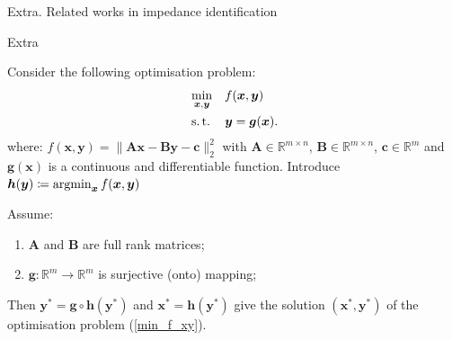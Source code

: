 \documentclass[../main.tex]{subfiles}
\begin{document}
\begin{frame}[t, noframenumbering]{Extra. Related works in impedance identification}
\begin{itemize}
\begin{itemize}
{\begin{figure}[H]
\end{figure}
}
\end{itemize}
\end{itemize}
\end{frame}

\begin{frame}[t]{Extra}

Consider the following optimisation problem:
\begin{equation}
\begin{aligned}
& \min_{\bm{x}, \bm{y}} 
& & f(\bm{x}, \bm{y}) \\
& \operatorname{s.t.}
& & \bm{y} = \bm{g}(\bm{x}).
\end{aligned}
\label{min_f_xy}
\end{equation}
where:
$f(\bm{x}, \bm{y}) = \|\bm{A}\bm{x} - \bm{B}\bm{y} - \bm{c} \|_2^2$ with $\bm{A} \in \mathbb{R}^{m\times n}$, $\bm{B} \in \mathbb{R}^{m\times n}$, $\bm{c} \in \mathbb{R}^{m}$ and $\bm{g}(\bm{x})$ is a continuous and differentiable function. Introduce $\bm{h}(\bm{y}) \coloneqq \operatorname{argmin}_{\bm{x}} f(\bm{x}, \bm{y})$

\begin{lemma}
\label{lemma1}
Assume:
\begin{enumerate}
\item $\bm{A}$ and $\bm{B}$ are full rank matrices;
\item $\bm{g} \colon \mathbb{R}^m \rightarrow \mathbb{R}^m$ is surjective (onto) mapping; 
\end{enumerate}
Then $\bm{y}^* = \bm{g} \circ \bm{h}(\bm{y}^*)$ and $\bm{x}^* = \bm{h}(\bm{y}^*)$ give the solution $(\bm{x}^*, \bm{y}^*)$ of the optimisation problem (\ref{min_f_xy}).
\end{lemma}

\end{frame}
\end{document}
